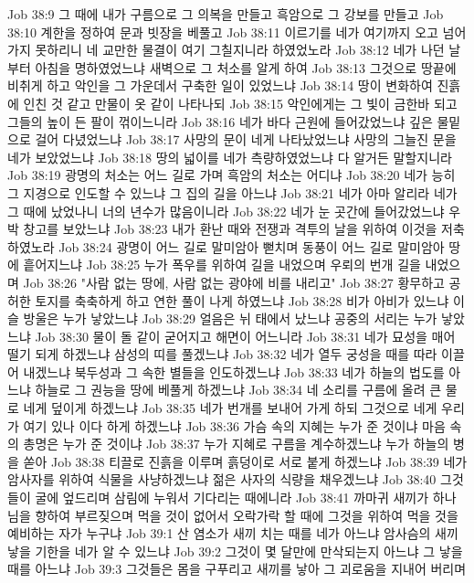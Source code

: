 Job 38:9  그 때에 내가 구름으로 그 의복을 만들고 흑암으로 그 강보를 만들고
Job 38:10  계한을 정하여 문과 빗장을 베풀고
Job 38:11  이르기를 네가 여기까지 오고 넘어가지 못하리니 네 교만한 물결이 여기 그칠지니라 하였었노라
Job 38:12  네가 나던 날부터 아침을 명하였었느냐 새벽으로 그 처소를 알게 하여
Job 38:13  그것으로 땅끝에 비취게 하고 악인을 그 가운데서 구축한 일이 있었느냐
Job 38:14  땅이 변화하여 진흙에 인친 것 같고 만물이 옷 같이 나타나되
Job 38:15  악인에게는 그 빛이 금한바 되고 그들의 높이 든 팔이 꺾이느니라
Job 38:16  네가 바다 근원에 들어갔었느냐 깊은 물밑으로 걸어 다녔었느냐
Job 38:17  사망의 문이 네게 나타났었느냐 사망의 그늘진 문을 네가 보았었느냐
Job 38:18  땅의 넓이를 네가 측량하였었느냐 다 알거든 말할지니라
Job 38:19  광명의 처소는 어느 길로 가며 흑암의 처소는 어디냐
Job 38:20  네가 능히 그 지경으로 인도할 수 있느냐 그 집의 길을 아느냐
Job 38:21  네가 아마 알리라 네가 그 때에 났었나니 너의 년수가 많음이니라
Job 38:22  네가 눈 곳간에 들어갔었느냐 우박 창고를 보았느냐
Job 38:23  내가 환난 때와 전쟁과 격투의 날을 위하여 이것을 저축하였노라
Job 38:24  광명이 어느 길로 말미암아 뻗치며 동풍이 어느 길로 말미암아 땅에 흩어지느냐
Job 38:25  누가 폭우를 위하여 길을 내었으며 우뢰의 번개 길을 내었으며
Job 38:26  "사람 없는 땅에, 사람 없는 광야에 비를 내리고"
Job 38:27  황무하고 공허한 토지를 축축하게 하고 연한 풀이 나게 하였느냐
Job 38:28  비가 아비가 있느냐 이슬 방울은 누가 낳았느냐
Job 38:29  얼음은 뉘 태에서 났느냐 공중의 서리는 누가 낳았느냐
Job 38:30  물이 돌 같이 굳어지고 해면이 어느니라
Job 38:31  네가 묘성을 매어 떨기 되게 하겠느냐 삼성의 띠를 풀겠느냐
Job 38:32  네가 열두 궁성을 때를 따라 이끌어 내겠느냐 북두성과 그 속한 별들을 인도하겠느냐
Job 38:33  네가 하늘의 법도를 아느냐 하늘로 그 권능을 땅에 베풀게 하겠느냐
Job 38:34  네 소리를 구름에 올려 큰 물로 네게 덮이게 하겠느냐
Job 38:35  네가 번개를 보내어 가게 하되 그것으로 네게 우리가 여기 있나 이다 하게 하겠느냐
Job 38:36  가슴 속의 지혜는 누가 준 것이냐 마음 속의 총명은 누가 준 것이냐
Job 38:37  누가 지혜로 구름을 계수하겠느냐 누가 하늘의 병을 쏟아
Job 38:38  티끌로 진흙을 이루며 흙덩이로 서로 붙게 하겠느냐
Job 38:39  네가 암사자를 위하여 식물을 사냥하겠느냐 젊은 사자의 식량을 채우겠느냐
Job 38:40  그것들이 굴에 엎드리며 삼림에 누워서 기다리는 때에니라
Job 38:41  까마귀 새끼가 하나님을 향하여 부르짖으며 먹을 것이 없어서 오락가락 할 때에 그것을 위하여 먹을 것을 예비하는 자가 누구냐
Job 39:1  산 염소가 새끼 치는 때를 네가 아느냐 암사슴의 새끼 낳을 기한을 네가 알 수 있느냐
Job 39:2  그것이 몇 달만에 만삭되는지 아느냐 그 낳을 때를 아느냐
Job 39:3  그것들은 몸을 구푸리고 새끼를 낳아 그 괴로움을 지내어 버리며

